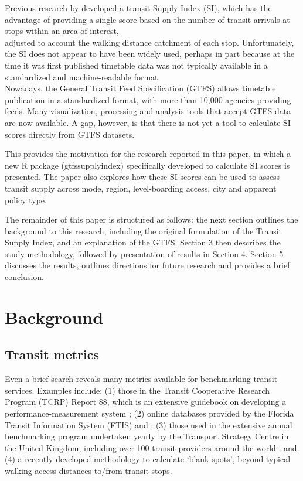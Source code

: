 \documentclass[preprint, 3p,
authoryear]{elsarticle} %
\begin{document}
Previous research by \citet{currie2007identifying} developed a transit
Supply Index (SI), which has the advantage of providing a single score
based on the number of transit arrivals at stops within an area of
interest,\\
adjusted to account the walking distance catchment of each stop.
Unfortunately, the SI does not appear to have been widely used, perhaps
in part because at the time it was first published timetable data was
not typically available in a standardized and machine-readable format.\\
Nowadays, the General Transit Feed Specification (GTFS) allows timetable
publication in a standardized format, with more than 10,000 agencies
providing feeds\citep{GTFS}. Many visualization, processing and analysis
tools that accept GTFS data are now available. A gap, however, is that
there is not yet a tool to calculate SI scores directly from GTFS
datasets.

This provides the motivation for the research reported in this paper, in
which a new R package (gtfssupplyindex) specifically developed to
calculate SI scores is presented. The paper also explores how these SI
scores can be used to assess transit supply across mode, region,
level-boarding access, city and apparent policy type.

The remainder of this paper is structured as follows: the next section
outlines the background to this research, including the original
formulation of the Transit Supply Index, and an explanation of the GTFS.
Section 3 then describes the study methodology, followed by presentation
of results in Section 4. Section 5 discusses the results, outlines
directions for future research and provides a brief conclusion.

\hypertarget{background}{%
\section{Background}\label{background}}

\hypertarget{transit-metrics}{%
\subsection{Transit metrics}\label{transit-metrics}}

Even a brief search reveals many metrics available for benchmarking
transit services. Examples include: (1) those in the Transit Cooperative
Research Program (TCRP) Report 88, which is an extensive guidebook on
developing a performance-measurement system \citep{Ryus:2003aa}; (2)
online databases provided by the Florida Transit Information System
(FTIS) \citep{Florida-Transit-Information-System:2018aa} and
\citet{UITP:2015aa}; (3) those used in the extensive annual benchmarking
program undertaken yearly by the Transport Strategy Centre in the United
Kingdom, including over 100 transit providers around the world
\citep{Imperial-College-London:2023aa}; and (4) a recently developed
methodology to calculate `blank spots', beyond typical walking access
distances to/from transit stops\citep{AlamriSultan2023GAoA}.
\end{document}
